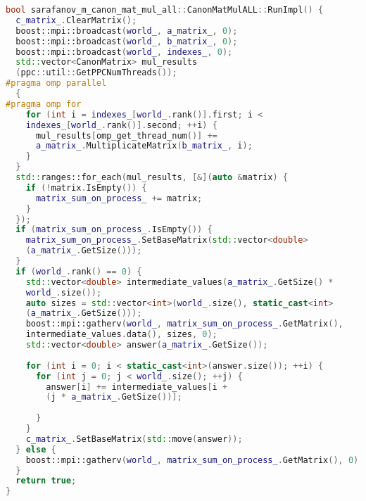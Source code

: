 \documentclass[12pt]{article}
\begin{document}
\begin{lstlisting}[language=C++]
bool sarafanov_m_canon_mat_mul_all::CanonMatMulALL::RunImpl() {
  c_matrix_.ClearMatrix();
  boost::mpi::broadcast(world_, a_matrix_, 0);
  boost::mpi::broadcast(world_, b_matrix_, 0);
  boost::mpi::broadcast(world_, indexes_, 0);
  std::vector<CanonMatrix> mul_results
  (ppc::util::GetPPCNumThreads());
#pragma omp parallel
  {
#pragma omp for
    for (int i = indexes_[world_.rank()].first; i < 
    indexes_[world_.rank()].second; ++i) {
      mul_results[omp_get_thread_num()] += 
      a_matrix_.MultiplicateMatrix(b_matrix_, i);
    }
  }
  std::ranges::for_each(mul_results, [&](auto &matrix) {
    if (!matrix.IsEmpty()) {
      matrix_sum_on_process_ += matrix;
    }
  });
  if (matrix_sum_on_process_.IsEmpty()) {
    matrix_sum_on_process_.SetBaseMatrix(std::vector<double>
    (a_matrix_.GetSize()));
  }
  if (world_.rank() == 0) {
    std::vector<double> intermediate_values(a_matrix_.GetSize() * 
    world_.size());
    auto sizes = std::vector<int>(world_.size(), static_cast<int>
    (a_matrix_.GetSize()));
    boost::mpi::gatherv(world_, matrix_sum_on_process_.GetMatrix(), 
    intermediate_values.data(), sizes, 0);
    std::vector<double> answer(a_matrix_.GetSize());
    
    for (int i = 0; i < static_cast<int>(answer.size()); ++i) {
      for (int j = 0; j < world_.size(); ++j) {
        answer[i] += intermediate_values[i +
        (j * a_matrix_.GetSize())];
        
      }
    }
    c_matrix_.SetBaseMatrix(std::move(answer));
  } else {
    boost::mpi::gatherv(world_, matrix_sum_on_process_.GetMatrix(), 0);
  }
  return true;
}
\end{lstlisting}
\end{document}
